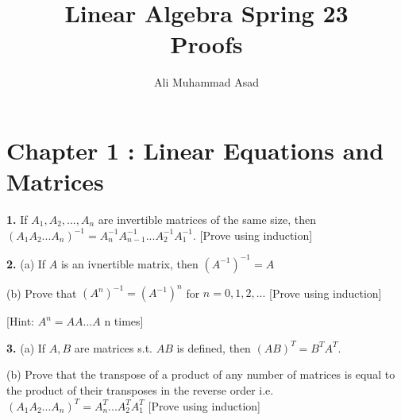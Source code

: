 \documentclass[addpoints]{exam}
\title{Linear Algebra Spring 23\\ Proofs}
\author{Ali Muhammad Asad}
\begin{document}
\maketitle
\begin{sloppypar}
\section*{\textbf{Chapter 1 : Linear Equations and Matrices}}
\begin{questions}
    \question
    \textbf{1. } If $ A_1, A_2,..., A_n $ are invertible matrices of the same size, then $ (A_1A_2...A_n)^{-1} = A_{n}^{-1}A_{n-1}^{-1}...A_{2}^{-1}A_{1}^{-1} $. [Prove using induction]
    \begin{solution}
        
    \end{solution}
    
    \question 
    \textbf{2. } (a) If $A$ is an ivnertible matrix, then $ (A^{-1})^{-1} = A $ 

    \hspace{5.5mm} (b) Prove that $ (A^n)^{-1} = (A^{-1})^n $ for $ n = 0, 1, 2, ... $ [Prove using induction] 
    
    [Hint: $ A^n = AA...A $ n times]
    \begin{solution}
        
    \end{solution}

    \question
    \textbf{3. } (a) If $ A, B $ are matrices s.t. $AB$ is defined, then $ (AB)^T = B^TA^T $. 

    (b) Prove that the transpose of a product of any number of matrices is equal to the product of their transposes in the reverse order i.e. $ (A_1A_2...A_n)^T = A_n^T...A_2^TA_1^T $ [Prove using induction]
    \begin{solution}
        
    \end{solution}

    

\end{questions}
\end{sloppypar}
\end{document}

